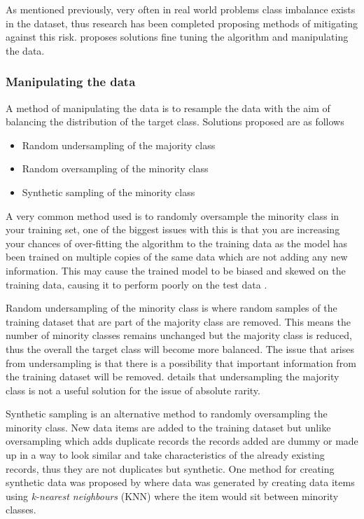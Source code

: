 As mentioned previously, very often in real world problems class imbalance exists in the dataset, thus research has been completed proposing methods of mitigating against this risk. \cite{chawla_editorial:_2004} proposes solutions fine tuning the algorithm and manipulating the data. 

\subsubsection{Manipulating the data} \label{sec:dataManip}

A method of manipulating the data is to resample the data with the aim of balancing the distribution of the target class. Solutions proposed are as follows

\begin{itemize}
	\item Random undersampling of the majority class
	\item Random oversampling of the minority class
	\item Synthetic sampling of the minority class 
\end{itemize}

A very common method used is to randomly oversample the minority class in your training set, one of the biggest issues with this is that you are increasing your chances of over-fitting the algorithm to the training data as the model has been trained on multiple copies of the same data which are not adding any new information. This may cause the trained model to be biased and skewed on the training data, causing it to perform poorly on the test data \cite[See][]{hawkins_problem_2004}.

Random undersampling of the minority class is where random samples of the training dataset that are part of the majority class are removed. This means the number of minority classes remains unchanged but the majority class is reduced, thus the overall the target class will become more balanced. The issue that arises from undersampling is that there is a possibility that important information from the training dataset will be removed. \cite{kennedy_credit_2013} details that undersampling the majority class is not a useful solution for the issue of absolute rarity.

Synthetic sampling is an alternative method to randomly oversampling the minority class. New data items are added to the training dataset but unlike oversampling which adds duplicate records the records added are dummy or made up in a way to look similar and take characteristics of the already existing records, thus they are not duplicates but synthetic. One method for creating synthetic data was proposed by \citep{chawla_smote:_2002} where data was generated by creating data items using \textit{k-nearest neighbours} (KNN) where the item would sit between minority classes.

